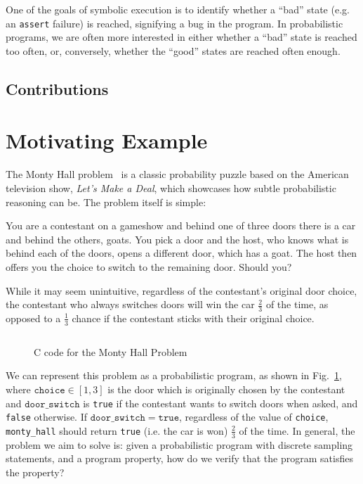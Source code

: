 \documentclass[acmsmall,review]{acmart}\settopmatter{}
\begin{document}
	One of the goals of symbolic execution is to identify whether a ``bad'' state (e.g. an \texttt{assert} failure) is reached, signifying a bug in the program.
	In probabilistic programs, we are often more interested in either whether a ``bad'' state is reached too often, or, conversely, whether the ``good'' states are reached often enough.
	
	
	\subsection{Contributions}
	\label{sec:contrib}
	
	\section{Motivating Example}
	\label{sec:motiv_example}
	
	The Monty Hall problem~\cite{selvin1975} is a classic probability puzzle based on the American television show, \textit{Let's Make a Deal}, which showcases how subtle probabilistic reasoning can be.
	The problem itself is simple:
	\begin{displayquote}
		You are a contestant on a gameshow and behind one of three doors there is a car and behind the others, goats.
		You pick a door and the host, who knows what is behind each of the doors, opens a different door, which has a goat.
		The host then offers you the choice to switch to the remaining door.
		Should you?
	\end{displayquote}
	While it may seem unintuitive, regardless of the contestant's original door choice, the contestant who always switches doors will win the car $\frac{2}{3}$ of the time, as opposed to a $\frac{1}{3}$ chance if the contestant sticks with their original choice.
	
	
	\begin{figure}\centering
		\inputminted[fontsize=\footnotesize,linenos]{c}{montyhall.c}
		\caption{C code for the Monty Hall Problem}
		\label{fig:montyhall}
	\end{figure}
	
	
	We can represent this problem as a probabilistic program, as shown in Fig.~\ref{fig:montyhall}, where $\mathtt{choice} \in [1,3]$ is the door which is originally chosen by the contestant and $\mathtt{door\_switch}$ is \texttt{true} if the contestant wants to switch doors when asked, and \texttt{false} otherwise.
	If $\mathtt{door\_switch} = \mathtt{true}$, regardless of the value of \texttt{choice}, \texttt{monty\_hall} should return \texttt{true} (i.e. the car is won) $\frac{2}{3}$ of the time.
	In general, the problem we aim to solve is: given a probabilistic program with discrete sampling statements, and a program property, how do we verify that the program satisfies the property?
	
\end{document}
